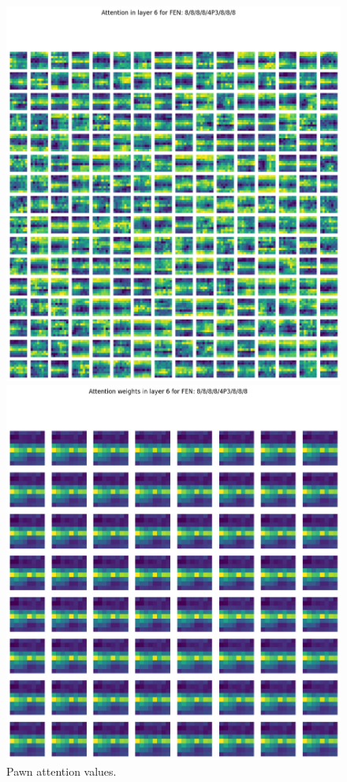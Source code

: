 \begin{figure}[H]
  \begin{minipage}{0.475\textwidth}
    \centering
    \includegraphics[width=\textwidth]{project/img/attention_maps/P_attention_6.png}
    \caption{Pawn attention values.}
    \label{atnP}
  \end{minipage}
  \hspace{0.05\textwidth}
  \begin{minipage}{0.475\textwidth}
    \centering
    \includegraphics[width=\textwidth]{project/img/attention_maps/P_weights_6.png}

\end{minipage}
\end{figure}
